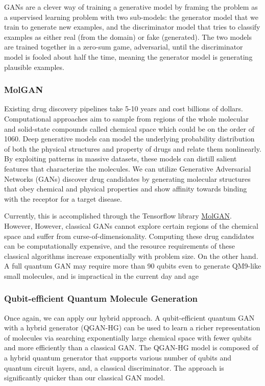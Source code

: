 \documentclass{scrartcl}
\begin{document}
GANs are a clever way of training a generative model by framing the problem as a supervised learning problem with two sub-models: the generator model that we train to generate new examples, and the discriminator model that tries to classify examples as either real (from the domain) or fake (generated). The two models are trained together in a zero-sum game, adversarial, until the discriminator model is fooled about half the time, meaning the generator model is generating plausible examples.

\subsubsection{MolGAN}
\label{sec:orgb6ea8c1}

Existing drug discovery pipelines take 5-10 years and cost billions of dollars. Computational approaches aim to sample from regions of the whole molecular and solid-state compounds called chemical space which could be on the order of 1060. Deep generative models can model the underlying probability distribution of both the physical structures and property of drugs and relate them nonlinearly. By exploiting patterns in massive datasets, these models can distill salient features that characterize the molecules. We can utilize Generative Adversarial Networks (GANs) discover drug candidates by generating molecular structures that obey chemical and physical properties and show affinity towards binding with the receptor for a target disease.

Currently, this is accomplished through the Tensorflow library \href{https://github.com/nicola-decao/MolGAN}{MolGAN}. However,  However, classical GANs cannot explore certain regions of the chemical space and suffer from curse-of-dimensionality. Computing these drug candidates can be computationally expensive, and the resource requirements of these classical algorithms increase exponentially with problem size. On the other hand. A full quantum GAN may require more than 90 qubits even to generate QM9-like small molecules, and is impractical in the current day and age

\subsubsection{Qubit-efficient Quantum Molecule Generation}
\label{sec:orgf04309c}

Once again, we can apply our hybrid approach. A qubit-efficient quantum GAN with a hybrid generator (QGAN-HG) can be used to learn a richer representation of molecules via searching exponentially large chemical space with fewer qubits and more efficiently than a classical GAN. The QGAN-HG model is composed of a hybrid quantum generator that supports various number of qubits and quantum circuit layers, and, a classical discriminator. The approach is significantly quicker than our classical GAN model.
\end{document}
